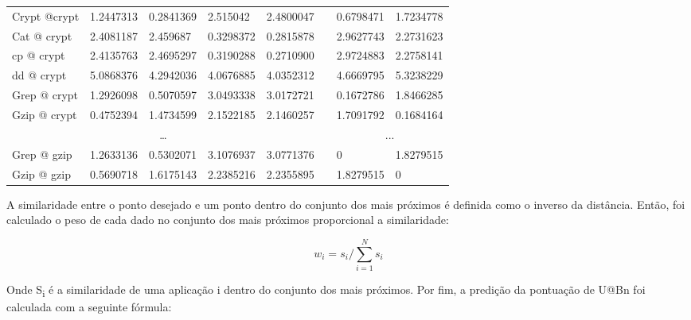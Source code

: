 \documentclass[[10pt,journal]{IEEEtran}
\begin{document}
\begin{table}[h]
{\begin{tabular}{|l|l|l|l|l|l|l|l|}
Crypt @crypt & 1.2447313    & 0.2841369    & 2.515042  & 2.4800047 &                     & 0.6798471           & 1.7234778           \\ \cline{1-5} \cline{7-8} 
Cat @ crypt  & 2.4081187    & 2.459687     & 0.3298372 & 0.2815878 &                     & 2.9627743           & 2.2731623           \\ \cline{1-5} \cline{7-8} 
cp @ crypt   & 2.4135763    & 2.4695297    & 0.3190288 & 0.2710900 &                     & 2.9724883           & 2.2758141           \\ \cline{1-5} \cline{7-8} 
dd @ crypt   & 5.0868376    & 4.2942036    & 4.0676885 & 4.0352312 &                     & 4.6669795           & 5.3238229           \\ \cline{1-5} \cline{7-8} 
Grep @ crypt & 1.2926098    & 0.5070597    & 3.0493338 & 3.0172721 &                     & 0.1672786           & 1.8466285           \\ \cline{1-5} \cline{7-8} 
Gzip @ crypt & 0.4752394    & 1.4734599    & 2.1522185 & 2.1460257 &                     & 1.7091792           & 0.1684164           \\ \cline{1-5} \cline{7-8} 
\multicolumn{5}{|c|}{\multirow{2}{*}{…}}                           &                     & \multicolumn{2}{c|}{\multirow{2}{*}{...}} \\
\multicolumn{5}{|c|}{}                                             &                     & \multicolumn{2}{c|}{}                     \\ \cline{1-5} \cline{7-8} 
Grep @ gzip  & 1.2633136    & 0.5302071    & 3.1076937 & 3.0771376 &                     & 0                   & 1.8279515           \\ \cline{1-5} \cline{7-8} 
Gzip @ gzip  & 0.5690718    & 1.6175143    & 2.2385216 & 2.2355895 &                     & 1.8279515           & 0                   \\ \hline
\end{tabular}}
\end{table}

 A similaridade entre o ponto desejado e um ponto dentro do conjunto dos mais próximos é definida como o inverso da distância. Então, foi calculado o peso de cada dado no conjunto dos mais próximos proporcional a similaridade:

\begin{equation}
\label{eq:prediction} 
w_i = s_i / \sum\limits_{i=1}^{N}s_i
\end{equation}

Onde S\textsubscript{i} é a similaridade de uma aplicação i dentro do conjunto dos mais próximos. Por fim, a predição da pontuação de U@Bn foi calculada com a seguinte fórmula:
\end{document}
